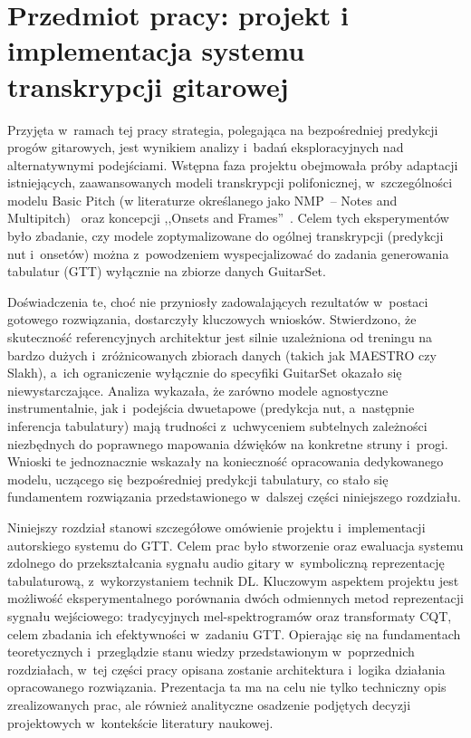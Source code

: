 \chapter{Przedmiot pracy: projekt i implementacja systemu transkrypcji gitarowej}
\label{chap:przedmiot_pracy}

Przyjęta w~ramach tej pracy strategia, polegająca na bezpośredniej predykcji progów gitarowych, jest wynikiem analizy i~badań eksploracyjnych nad alternatywnymi podejściami. Wstępna faza projektu obejmowała próby adaptacji istniejących, zaawansowanych modeli transkrypcji polifonicznej, w~szczególności modelu Basic Pitch (w literaturze określanego jako NMP~– Notes and Multipitch)~\autocite{Bittner2022BasicPitch} oraz koncepcji ,,Onsets and Frames''~\autocite{Hawthorne2018Onsets}. Celem tych eksperymentów było zbadanie, czy modele zoptymalizowane do ogólnej transkrypcji (predykcji nut i~onsetów) można z~powodzeniem wyspecjalizować do zadania generowania tabulatur (GTT) wyłącznie na zbiorze danych GuitarSet.

Doświadczenia te, choć nie przyniosły zadowalających rezultatów w~postaci gotowego rozwiązania, dostarczyły kluczowych wniosków. Stwierdzono, że skuteczność referencyjnych architektur jest silnie uzależniona od treningu na bardzo dużych i~zróżnicowanych zbiorach danych (takich jak MAESTRO czy Slakh), a~ich ograniczenie wyłącznie do specyfiki GuitarSet okazało się niewystarczające. Analiza wykazała, że zarówno modele agnostyczne instrumentalnie, jak i~podejścia dwuetapowe (predykcja nut, a~następnie inferencja tabulatury) mają trudności z~uchwyceniem subtelnych zależności niezbędnych do poprawnego mapowania dźwięków na konkretne struny i~progi. Wnioski te jednoznacznie wskazały na konieczność opracowania dedykowanego modelu, uczącego się bezpośredniej predykcji tabulatury, co stało się fundamentem rozwiązania przedstawionego w~dalszej części niniejszego rozdziału.

Niniejszy rozdział stanowi szczegółowe omówienie projektu i~implementacji autorskiego systemu do GTT. Celem prac było stworzenie oraz ewaluacja systemu zdolnego do przekształcania sygnału audio gitary w~symboliczną reprezentację tabulaturową, z~wykorzystaniem technik DL. Kluczowym aspektem projektu jest możliwość eksperymentalnego porównania dwóch odmiennych metod reprezentacji sygnału wejściowego: tradycyjnych mel-spektrogramów oraz transformaty CQT, celem zbadania ich efektywności w~zadaniu GTT. Opierając się na fundamentach teoretycznych i~przeglądzie stanu wiedzy przedstawionym w~poprzednich rozdziałach, w~tej części pracy opisana zostanie architektura i~logika działania opracowanego rozwiązania. Prezentacja ta ma na celu nie tylko techniczny opis zrealizowanych prac, ale również analityczne osadzenie podjętych decyzji projektowych w~kontekście literatury naukowej.

